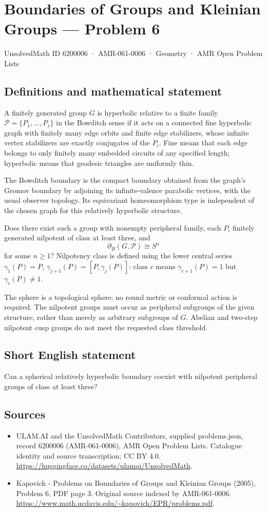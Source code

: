 \documentclass[11pt,a4paper]{article}
\begin{document}
\section*{Boundaries of Groups and Kleinian Groups — Problem 6}\label{6200006}
{\small UnsolvedMath ID 6200006 · AMR-061-0006 · Geometry · AMR Open Problem Lists}
\subsection{Definitions and mathematical statement}
A finitely generated group $G$ is hyperbolic relative to a finite family $\mathcal P=\{P_1,\ldots,P_s\}$ in the Bowditch sense if it acts on a connected fine hyperbolic graph with finitely many edge orbits and finite edge stabilizers, whose infinite vertex stabilizers are exactly conjugates of the $P_i$. Fine means that each edge belongs to only finitely many embedded circuits of any specified length; hyperbolic means that geodesic triangles are uniformly thin.

The Bowditch boundary is the compact boundary obtained from the graph's Gromov boundary by adjoining its infinite-valence parabolic vertices, with the usual observer topology. Its equivariant homeomorphism type is independent of the chosen graph for this relatively hyperbolic structure.

Does there exist such a group with nonempty peripheral family, each $P_i$ finitely generated nilpotent of class at least three, and
\[
 \partial_B(G,\mathcal P)\cong S^n
\]
for some $n\geq1$? Nilpotency class is defined using the lower central series $\gamma_1(P)=P$, $\gamma_{j+1}(P)=[P,\gamma_j(P)]$: class $c$ means $\gamma_{c+1}(P)=1$ but $\gamma_c(P)\ne1$.

The sphere is a topological sphere; no round metric or conformal action is required. The nilpotent groups must occur as peripheral subgroups of the given structure, rather than merely as arbitrary subgroups of $G$. Abelian and two-step nilpotent cusp groups do not meet the requested class threshold.
\subsection{Short English statement}
Can a spherical relatively hyperbolic boundary coexist with nilpotent peripheral groups of class at least three?
\subsection{Sources}
\begin{itemize}
\item[S1] ULAM.AI and the UnsolvedMath Contributors, supplied problems.json, record 6200006 (AMR-061-0006), AMR Open Problem Lists. Catalogue identity and source transcription; CC BY 4.0.
\url{https://huggingface.co/datasets/ulamai/UnsolvedMath}.
\item[S2] Kapovich - Problems on Boundaries of Groups and Kleinian Groups (2005), Problem 6, PDF page 3. Original source indexed by AMR-061-0006.
\url{https://www.math.ucdavis.edu/~kapovich/EPR/problems.pdf}.
\end{itemize}
\end{document}
